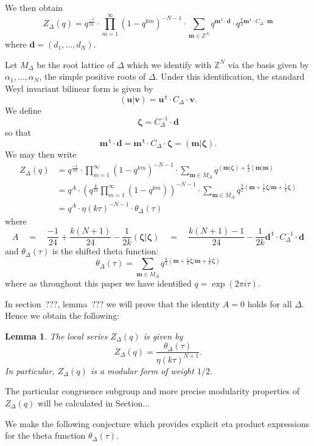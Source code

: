 \documentclass{article}
\newtheorem{lemma}[theorem]{Lemma}
\theoremstyle{definition}
\newcommand{\ZZ} {{\mathbb Z}}		%
\renewcommand{\top}{\,\mathsf{t}}
\newcommand{\mvec}{\bm{m}}
\newcommand{\zetavec}{\bm{\zeta }}
\newcommand{\dvec}{\bm{d }}
\newcommand{\uvec}{\bm{u }}
\newcommand{\vvec}{\bm{v }}
\begin{document}
We then obtain
\[
Z_{\Delta}(q) = q^{\frac{-1}{24}}\cdot
\prod_{m=1}^{\infty}(1-q^{km})^{-N-1} \cdot \sum_{\mvec \in \ZZ^{N}}
q^{\mvec^{\top}\cdot \dvec} \cdot q^{\frac{k}{2}\mvec^{\top}\cdot C_{\Delta}\cdot \mvec}
\]
where $\dvec =(d_{1},\dotsc ,d_{N})$.

Let $M_{\Delta}$ be the root lattice of $\Delta$ which we identify
with $\ZZ^{N}$ via the basis given by $\alpha_{1},\dotsc ,\alpha_{N}$,
the simple positive roots of $\Delta$. Under this identification, the
standard Weyl invariant bilinear form is given by
\[
(\uvec |\vvec ) = \uvec^{\top}\cdot C_{\Delta}\cdot \vvec .
\]
We define
\[
\zetavec = C_{\Delta}^{-1} \cdot \dvec 
\]
so that 
\[
\mvec^{\top}\cdot \dvec = \mvec^{\top}\cdot C_{\Delta} \cdot \zetavec
= (\mvec |\zetavec ).
\]
We may then write
\begin{align*}
Z_{\Delta}(q)& = q^{\frac{-1}{24}}\cdot
\prod_{m=1}^{\infty}(1-q^{km})^{-N-1}\cdot \sum _{\mvec \in M_{\Delta}} q^{(\mvec |\zetavec )+\frac{k}{2}(\mvec |\mvec)}\\
&= q^{A} \cdot \left(q^{\frac{k}{24}}\prod_{m=1}^{\infty}(1-q^{km})
\right)^{-N-1} \cdot \sum_{\mvec \in M_{\Delta}} q^{\frac{k}{2}\left(\mvec +\frac{1}{k}\zetavec |\mvec +\frac{1}{k}\zetavec  \right)}\\
& = q^{A}\cdot  \eta (k\tau )^{-N-1}\cdot  \theta_{\Delta} (\tau )
\end{align*}
where 
\[
A \quad = \quad \frac{-1}{24} + \frac{k(N+1)}{24} - \frac{1}{2k}(\zetavec
|\zetavec ) \quad = \quad \frac{k(N+1)-1}{24} - \frac{1}{2k}\dvec^{\top}\cdot
C_{\Delta}^{-1} \cdot \dvec 
\]
and $\theta_{\Delta}(\tau )$ is the shifted theta function:
\[
\theta_{\Delta}(\tau ) = \sum_{\mvec \in M_{\Delta}} q^{\frac{k}{2}\left(\mvec +\frac{1}{k}\zetavec |\mvec +\frac{1}{k}\zetavec  \right)}
\]
where as throughout this paper we have identified $q=\exp\left(2\pi i\tau  \right)$.

In section~???, lemma~??? we will prove that the identity $A=0$ holds
for all $\Delta$. Hence we obtain the following:
\begin{lemma}\label{lem: local series as theta/eta} The local series
$Z_{\Delta}(q)$ is given by
\[
Z_{\Delta}(q) = \frac{\theta_{\Delta}(\tau )}{\eta (k\tau )^{N+1}}. 
\]
In particular, $Z_{\Delta}(q)$  is a modular form of weight $1/2$.
\end{lemma}
The particular congruence subgroup and more precise modularity properties of $Z_{\Delta}(q)$ will be calculated in Section...

We make the following conjecture which provides explicit eta product
expressions for the theta function $\theta_{\Delta}(\tau )$.
\end{document}
